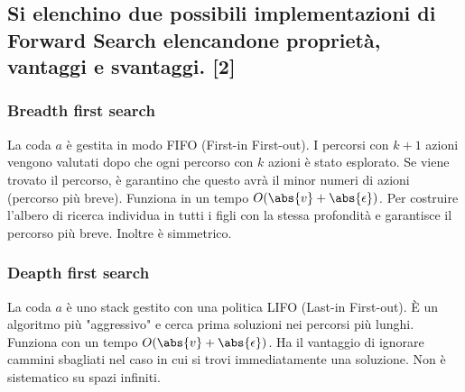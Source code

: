 \documentclass[\main/main.tex]{subfiles}
\begin{document}
\subsection{Si elenchino due possibili implementazioni di Forward Search elencandone proprietà, vantaggi e svantaggi. [2]}

\subsubsection{Breadth first search}
La coda $a$ è gestita in modo FIFO (First-in First-out). I percorsi con $k+1$ azioni vengono valutati dopo che ogni percorso con $k$ azioni è stato esplorato. Se viene trovato il percorso, è garantino che questo avrà il minor numeri di azioni (percorso più breve).
Funziona in un tempo $O(\abs{v}+ \abs{\epsilon})$.
Per costruire l'albero di ricerca individua in tutti i figli con la stessa profondità e garantisce il percorso più breve. Inoltre è simmetrico.

\subsubsection{Deapth first search}
La coda $a$ è uno stack gestito con una politica LIFO (Last-in First-out). È un algoritmo più "aggressivo" e cerca prima soluzioni nei percorsi più lunghi.
Funziona con un tempo $O(\abs{v}+ \abs{\epsilon})$.
Ha il vantaggio di ignorare cammini sbagliati nel caso in cui si trovi immediatamente una soluzione.
Non è sistematico su spazi infiniti.
\end{document}
